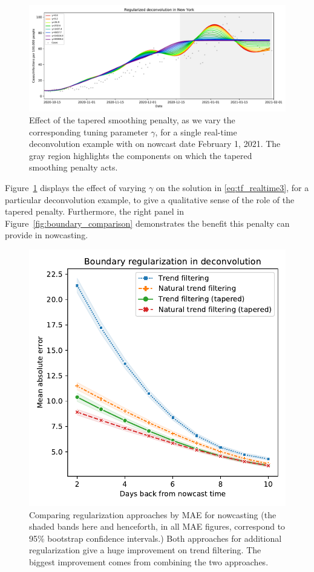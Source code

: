 \documentclass[sts]{imsart}
\theoremstyle{plain}
\theoremstyle{definition}
\theoremstyle{remark}
\begin{document}
\begin{figure}[tb]
\centering
\includegraphics[width=0.95\linewidth]{./figures/effect_tapered_ntf.pdf}
\caption{Effect of the tapered smoothing penalty, as we vary the 
corresponding tuning parameter $\gamma$, for a single real-time 
deconvolution example with on nowcast date February 1, 2021. The gray 
region highlights the  components on which the tapered smoothing penalty 
acts.}
\label{fig:tapered_smooth}
\end{figure}

Figure~\ref{fig:tapered_smooth} displays the effect of varying $\gamma$ on the
solution in \eqref{eq:tf_realtime3}, for a particular deconvolution example, to
give a qualitative sense of the role of the tapered penalty. Furthermore, the
right panel in Figure~\ref{fig:boundary_comparison} demonstrates the benefit
this penalty can provide in nowcasting.

\begin{figure}[tb]
\centering
\includegraphics[width=0.85\linewidth]{./figures/tapered_smoothing_03_small_square.pdf}
\caption{Comparing regularization approaches by MAE for nowcasting (the shaded
  bands here and henceforth, in all MAE figures, correspond to 95\% bootstrap
  confidence intervals.) Both approaches for additional regularization give a
  huge improvement on trend filtering. The biggest improvement comes from
  combining the two approaches.}
	\label{fig:extra_reg}
\end{figure}
\end{document}
